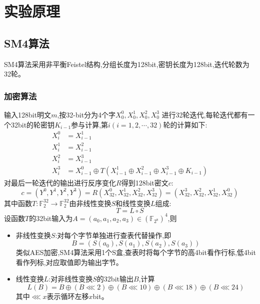 \section{实验原理}
\subsection{SM4算法}
SM4算法采用非平衡Feistel结构,分组长度为128bit,密钥长度为128bit,迭代轮数为32轮。
\subsubsection{加密算法}
输入128bit明文\(m\),按32-bit分为4个字\(X^0_0,X^1_0,X^2_0,X^3_0\)
进行32轮迭代,每轮迭代都有一个32bit的轮密钥$K_{i-1}$参与计算,第$i(i = 1,2,\cdots,32)$轮的计算如下:
\[
\begin{aligned}
    X^0_{i} &= X^1_{i-1} \\
    X^1_{i} &= X^2_{i-1} \\
    X^2_{i} &= X^3_{i-1} \\
    X^3_{i} &= X^0_{i-1} \oplus T(X^1_{i-1}\oplus X^2_{i-1}\oplus X^3_{i-1}\oplus K_{i-1})
\end{aligned}
\]
对最后一轮迭代的输出进行反序变化$R$得到128bit密文\(c\):
\[
c = (Y^0,Y^1,Y^2,Y^3) = R(X^{0}_{32},X_{32}^1,X_{32}^2,X_{32}^3) = (X^3_{32},X^2_{32},X^1_{32},X^0_{32})
\]
其中函数$T:\mathbb{F}_2^{32}\to \mathbb{F}_2^{32}$由非线性变换\(S\)和线性变换\(L\)组成:
\[    T = L\circ  S   \]
设函数$T$的32bit输入为$A = (a_0,a_1,a_2,a_3) \in (\mathbb{F}_{2^8})^4$,则
\begin{itemize}
    \item 非线性变换$S$:对每个字节单独进行查表代替操作,即
    \[ B = (S(a_0),S(a_1),S(a_2),S(a_3))  \]
类似AES加密,SM4算法采用1个S盒,查表时将每个字节的高4bit看作行标,低4bit看作列标,对应取值即为输出字节。
    \item 线性变换$L$:对非线性变换$S$的32bit输出$B$,计算
    \[   L(B) = B \oplus (B \lll 2) \oplus (B \lll 10) \oplus (B \lll 18) \oplus (B \lll 24) \]
    其中$\lll x$表示循环左移$x$bit。
\end{itemize}
